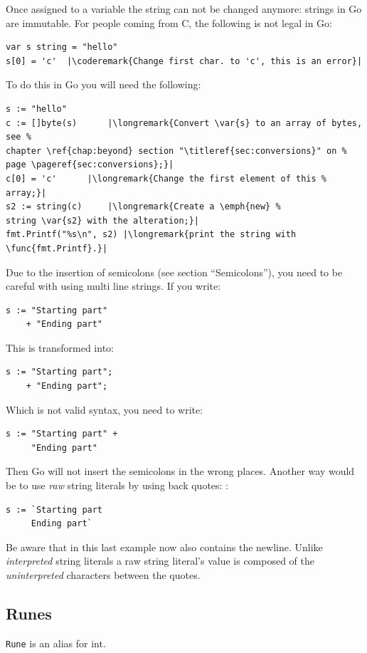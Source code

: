 Once assigned to a variable the string can not be changed anymore: strings in Go are
immutable. For
people coming from C, the following is not legal in Go:
\begin{lstlisting}
var s string = "hello"
s[0] = 'c'  |\coderemark{Change first char. to 'c', this is an error}|
\end{lstlisting}
To do this in Go you will need the following:
\begin{lstlisting}
s := "hello"
c := []byte(s)	    |\longremark{Convert \var{s} to an array of bytes, see %
chapter \ref{chap:beyond} section "\titleref{sec:conversions}" on %
page \pageref{sec:conversions};}|
c[0] = 'c'	    |\longremark{Change the first element of this %
array;}|
s2 := string(c)     |\longremark{Create a \emph{new} %
string \var{s2} with the alteration;}|
fmt.Printf("%s\n", s2) |\longremark{print the string with \func{fmt.Printf}.}|
\end{lstlisting}
\showremarks

\begin{lbar}
Due to the insertion of semicolons (see \cite{effective_go} section
``Semicolons''), you need to be careful with using multi line strings. If
you write:
\begin{lstlisting}
s := "Starting part"
    + "Ending part"
\end{lstlisting}
This is transformed into:
\begin{lstlisting}
s := "Starting part";
    + "Ending part";
\end{lstlisting}
Which is not valid syntax, you need to write:
\begin{lstlisting}
s := "Starting part" +
     "Ending part"
\end{lstlisting}
Then Go will not insert the semicolons in the wrong places. Another way
would be to use \emph{raw} string literals by using back quotes: :
\begin{lstlisting}
s := `Starting part
     Ending part`
\end{lstlisting}
Be aware that in this last example  now also contains the newline.
Unlike \emph{interpreted} string literals  a raw string literal's value
is composed of the \emph{uninterpreted} characters between the quotes.
\end{lbar}

\subsection{Runes}
\lstinline{Rune} is an alias for int. 

